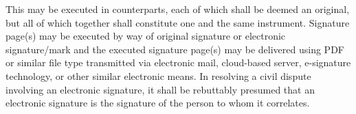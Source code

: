 This \lease may be executed in counterparts, each of which shall be deemed an original, but all of which together shall constitute one and the same instrument. Signature page(s) may be executed by way of original signature or electronic signature/mark and the executed signature page(s) may be delivered using PDF or similar file type transmitted via electronic mail, cloud-based server, e-signature technology, or other similar electronic means. In resolving a civil dispute involving an electronic signature, it shall be rebuttably presumed that an electronic signature is the signature of the person to whom it correlates.
